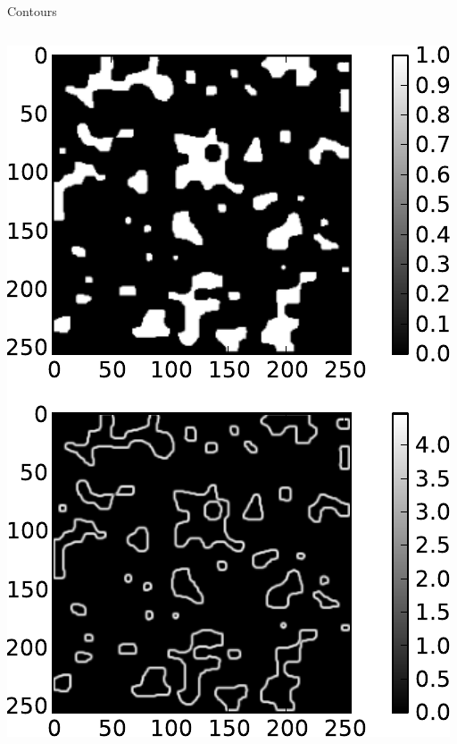 \documentclass[8pt,a4paper]{beamer}
\begin{document}
\begin{frame}[containsverbatim]{Contours}
  \begin{columns}
  \includegraphics[width=\textwidth]{figures/contours.pdf} 
  
    \end{columns}
\end{frame}  
\end{document}
